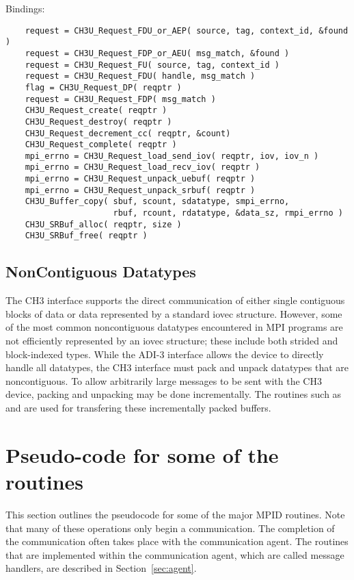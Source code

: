 \documentclass{article}
\begin{document}
Bindings:
\begin{verbatim}
    request = CH3U_Request_FDU_or_AEP( source, tag, context_id, &found )
    request = CH3U_Request_FDP_or_AEU( msg_match, &found )
    request = CH3U_Request_FU( source, tag, context_id )
    request = CH3U_Request_FDU( handle, msg_match )
    flag = CH3U_Request_DP( reqptr )
    request = CH3U_Request_FDP( msg_match )
    CH3U_Request_create( reqptr )
    CH3U_Request_destroy( reqptr )
    CH3U_Request_decrement_cc( reqptr, &count)
    CH3U_Request_complete( reqptr )
    mpi_errno = CH3U_Request_load_send_iov( reqptr, iov, iov_n )
    mpi_errno = CH3U_Request_load_recv_iov( reqptr )
    mpi_errno = CH3U_Request_unpack_uebuf( reqptr )
    mpi_errno = CH3U_Request_unpack_srbuf( reqptr )
    CH3U_Buffer_copy( sbuf, scount, sdatatype, smpi_errno,
                      rbuf, rcount, rdatatype, &data_sz, rmpi_errno )
    CH3U_SRBuf_alloc( reqptr, size )
    CH3U_SRBuf_free( reqptr )
\end{verbatim}

\subsection{NonContiguous Datatypes}
The CH3 interface supports the direct communication of either single
contiguous blocks of data or data represented by a standard iovec
structure.  However, some of the most common noncontiguous datatypes
encountered in MPI programs are not efficiently represented by an
iovec structure; these include both strided and block-indexed types.
While the ADI-3 interface allows the device to directly handle all
datatypes, the CH3 interface must pack and unpack datatypes that are
noncontiguous.  To allow arbitrarily large messages to be sent with
the CH3 device, packing and unpacking may be done incrementally.  The
routines such as  and  are used for
transfering these incrementally packed buffers.

\section{Pseudo-code for some of the \protect{} routines}
This section outlines the pseudocode for some of the major MPID
routines.
Note that many of these operations only begin a communication.  The
completion of the communication often takes place with the
communication agent.  The routines that are implemented within the
communication agent, which are called message handlers, are described
in Section~\ref{sec:agent}.
\end{document}
